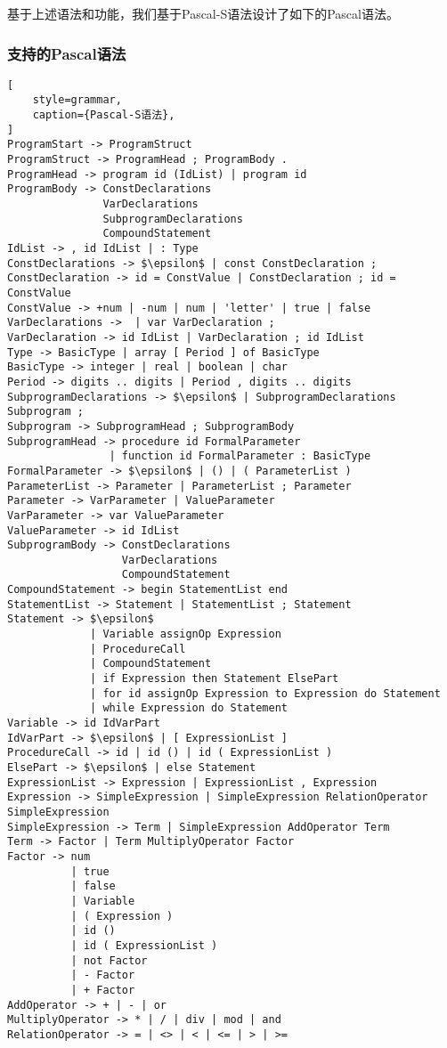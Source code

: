 \documentclass[../main.tex]{subfiles}
\begin{document}
基于上述语法和功能，我们基于Pascal-S语法设计了如下的Pascal语法。

\subsubsection{支持的Pascal语法}\label{pascal_grammar}

\begin{lstlisting}[
    style=grammar,
    caption={Pascal-S语法},
]
ProgramStart -> ProgramStruct
ProgramStruct -> ProgramHead ; ProgramBody .
ProgramHead -> program id (IdList) | program id
ProgramBody -> ConstDeclarations
               VarDeclarations
               SubprogramDeclarations
               CompoundStatement
IdList -> , id IdList | : Type
ConstDeclarations -> $\epsilon$ | const ConstDeclaration ;
ConstDeclaration -> id = ConstValue | ConstDeclaration ; id = ConstValue
ConstValue -> +num | -num | num | 'letter' | true | false
VarDeclarations ->  | var VarDeclaration ;
VarDeclaration -> id IdList | VarDeclaration ; id IdList
Type -> BasicType | array [ Period ] of BasicType
BasicType -> integer | real | boolean | char
Period -> digits .. digits | Period , digits .. digits
SubprogramDeclarations -> $\epsilon$ | SubprogramDeclarations Subprogram ;
Subprogram -> SubprogramHead ; SubprogramBody
SubprogramHead -> procedure id FormalParameter 
                | function id FormalParameter : BasicType
FormalParameter -> $\epsilon$ | () | ( ParameterList )
ParameterList -> Parameter | ParameterList ; Parameter
Parameter -> VarParameter | ValueParameter
VarParameter -> var ValueParameter
ValueParameter -> id IdList
SubprogramBody -> ConstDeclarations
                  VarDeclarations
                  CompoundStatement
CompoundStatement -> begin StatementList end
StatementList -> Statement | StatementList ; Statement
Statement -> $\epsilon$
             | Variable assignOp Expression
             | ProcedureCall
             | CompoundStatement
             | if Expression then Statement ElsePart
             | for id assignOp Expression to Expression do Statement
             | while Expression do Statement
Variable -> id IdVarPart
IdVarPart -> $\epsilon$ | [ ExpressionList ]
ProcedureCall -> id | id () | id ( ExpressionList )
ElsePart -> $\epsilon$ | else Statement
ExpressionList -> Expression | ExpressionList , Expression
Expression -> SimpleExpression | SimpleExpression RelationOperator SimpleExpression
SimpleExpression -> Term | SimpleExpression AddOperator Term
Term -> Factor | Term MultiplyOperator Factor
Factor -> num 
          | true
          | false
          | Variable
          | ( Expression )
          | id () 
          | id ( ExpressionList )
          | not Factor
          | - Factor
          | + Factor
AddOperator -> + | - | or
MultiplyOperator -> * | / | div | mod | and
RelationOperator -> = | <> | < | <= | > | >=
\end{lstlisting}
\end{document}
